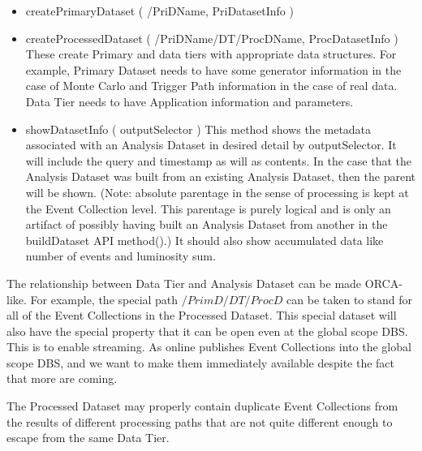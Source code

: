 \documentclass[pdftex]{cmspaper}
\begin{document}
\begin{itemize}
\item  createPrimaryDataset ( /PriDName, PriDatasetInfo )
\item  createProcessedDataset ( /PriDName/DT/ProcDName, ProcDatasetInfo )
      These create Primary and data tiers with appropriate data
      structures.  For example, Primary Dataset needs to have some
      generator information in the case of Monte Carlo and Trigger Path
      information in the case of real data.  Data Tier needs to have
      Application information and parameters.

\item  showDatasetInfo ( outputSelector )
      This method shows the metadata associated with an Analysis Dataset
      in desired detail by outputSelector.  It will include the query
      and timestamp as will as contents.  In the case that the Analysis
      Dataset was built from an existing Analysis Dataset, then the parent
      will be shown.  (Note: absolute parentage in the sense of processing
      is kept at the Event Collection level.  This parentage is purely
      logical and is only an artifact of possibly having built an Analysis
      Dataset from another in the buildDataset API method().)  It should
      also show accumulated data like number of events and luminosity sum.

\end{itemize}

The relationship between Data Tier and Analysis Dataset can be made
ORCA-like.  For example, the special path $/PrimD/DT/ProcD$ can be taken to
stand for all of the Event Collections in the Processed Dataset. This special 
dataset will also have the special property that it can be open even at the
global scope DBS.  This is to enable streaming.  As online publishes
Event Collections into the global scope DBS, and we want to make them
immediately available despite the fact that more are coming.

The Processed Dataset may properly contain duplicate Event Collections from
the results of different processing paths that are not quite different
enough to escape from the same Data Tier. 
\end{document}
